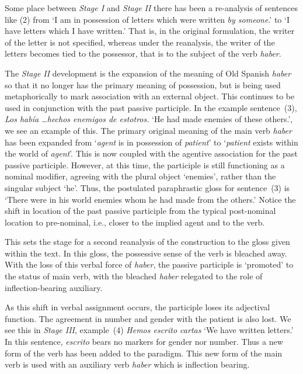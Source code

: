 \documentclass[12pt]{article}
\begin{document}
Some place between {\it Stage I} and {\it Stage II} there has been a re-analysis of sentences like (2) from `I am in possession of letters which were written {\it by someone}.' to `I have letters which I have written.' That is, in the original formulation, the writer of the letter is not specified, whereas under the reanalysis, the writer of the letters becomes tied to the possessor, that is to the subject of the verb {\it haber}.

The {\it Stage II} development is the expansion of the meaning of Old Spanish {\it haber} so that it no longer has the primary meaning of possession, but is being used metaphorically to mark association with an external object. This continues to be used in conjunction with the past passive participle. In the example sentence~(3), {\it Los hab\'ia \ldots hechos enemigos de estotros.} `He had made enemies of these others.', we see an example of this. The primary original meaning of the main verb {\it haber} has been expanded from `{\it agent} is in possession of {\it patient}' to `{\it patient} exists within the world of {\it agent}'. This is now coupled with the agentive association for the past passive participle. However, at this time, the participle is still functioning as a nominal modifier, agreeing with the plural object `enemies', rather than the singular subject `he'. Thus, the postulated paraphrastic gloss for sentence~(3) is `There were in his world enemies whom he had made from the others.' Notice the shift in location of the past passive participle from the typical post-nominal location to pre-nominal, i.e., closer to the implied agent and to the verb.

This sets the stage for a second reanalysis of the construction to the gloss given within the text. In this gloss, the possessive sense of the verb is bleached away. With the loss of this verbal force of {\it haber}, the passive participle is `promoted' to the status of main verb, with the bleached {\it haber} relegated to the role of inflection-bearing auxiliary.

As this shift in verbal assignment occurs, the participle loses its adjectival function. The agreement in number and gender with the patient is also lost. We see this in {\it Stage III}, example~(4) {\it Hemos escrito cartas} `We have written letters.' In this sentence, {\it escrito} bears no markers for gender nor number. Thus a new form of the verb has been added to the paradigm. This new form of the main verb is used with an auxiliary verb {\it haber} which is inflection bearing.
\end{document}
